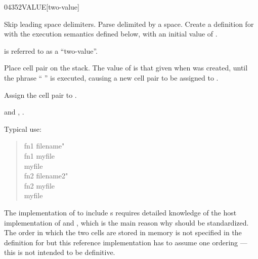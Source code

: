 
\enlargethispage{6ex}
\begin{worddef}{0435}{2VALUE}[two-value]%
\item {}

	Skip leading space delimiters.  Parse  delimited by a
	space.  Create a definition for  with the execution
	semantics defined below, with an initial value of .

	 is referred to as a ``two-value''.

\execute[name]

	Place cell pair  on the stack.  The value of
	 is that given when  was created,
	until the phrase ``  '' is
	executed, causing a new cell pair  to be assigned
	to .


	Assign the cell pair  to .

\see {} and ,
	.

	\begin{rationale} %
		Typical use:
		\begin{quote}\ttfamily
			\word{:} fn1  filename" \word{;} \\
			fn1  myfile \\
			myfile  \\[2ex]
			\word{:} fn2  filename2" \word{;} \\
			fn2  myfile \\
			myfile 
		\end{quote}
	\end{rationale}

	\begin{implement} %
		\dffamily
		The implementation of  to include s
		requires detailed knowledge of the host implementation of
		 and , which is the main reason why
		 should be standardized.  The order in which
		the two cells are stored in memory is not specified in the
		definition for  but this reference implementation
		has to assume one ordering --- this is not intended to be
		definitive.


\end{implement}
\end{worddef}
